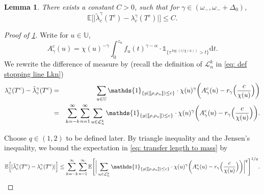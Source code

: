 \documentclass[12pt]{article}
\def\llbracket{[\hspace{-.10em} [ }
\def\rrbracket{ ] \hspace{-.10em}]}
\numberwithin{equation}{section}
\theoremstyle{plain}
\newtheorem{lem}[thm]{Lemma}
\theoremstyle{definition}
\begin{document}
\begin{lem}\label{lem: transfer length to mass}
There exists a constant $C>0$, such that for $\gamma \in (\omega_-, \omega_- + \Delta_0)$,
\begin{equation}\label{eq: transfer length to mass}
\mathbb{E}\Big[\Big|\tilde{\lambda}^{\gamma}_c(T^c)-\lambda^{\gamma}_c(T^c)\Big|\Big]\leq C.
\end{equation}
\end{lem}

\begin{proof}[Proof of \cref{lem: transfer length to mass}]
Write for $u\in\mathbb{U}$,
\[A^{c}_{\gamma}(u) = \chi(u)^{-\gamma}\int^{z_u}_0 f_u(t)^{\gamma-\alpha}\cdot\mathds{1}_{\{\tau^{\log(c/\chi(u))}>t\}}\mathrm{d}t. \]
\noindent We rewrite the difference of measure by (recall the definition of $\mathcal{L}^k_n$ in \eqref{eq: def stopping line Lkn})
\begin{eqnarray*}
\lambda^{\gamma}_c(T^c) - \tilde{\lambda}^{\gamma}_c(T^c) &=& \sum_{u\in\mathbb{U}}\mathds{1}_{\{g(\llbracket \rho, \rho_u \rrbracket)\leq c\}}\cdot \chi(u)^{\gamma}\bigg(A^{c}_{\gamma}(u) - r_{\gamma}\Big(\frac{c}{\chi(u)}\Big)\bigg) \\
&=& \sum_{k=-b}^{\infty}\sum^{\infty}_{n=1} \sum_{u\in\mathcal{L}^k_n} \mathds{1}_{\{g(\llbracket \rho, \rho_u \rrbracket)\leq c\}}\cdot \chi(u)^{\gamma} \bigg(A^{c}_{\gamma}(u) - r_{\gamma}\Big(\frac{c}{\chi(u)}\Big)\bigg).
\end{eqnarray*}

\noindent Choose $q\in (1, 2)$ to be defined later. By triangle inequality and the Jensen's inequality, we bound the expectation in \eqref{eq: transfer length to mass} by
\[ \mathbb{E}\Big[|\tilde\lambda^{\gamma}_c(T^c)-\lambda^{\gamma}_c(T^c)|\Big] \leq \sum^{\infty}_{k=-b}\sum^{\infty}_{n=1}\mathbb{E}\Bigg[\bigg|\sum_{u\in\mathcal{L}^k_n}\mathds{1}_{\{g(\llbracket \rho, \rho_u \rrbracket)\leq c\}}\cdot \chi(u)^{\gamma}\bigg(A^{c}_{\gamma}(u) - r_{\gamma}\Big(\frac{c}{\chi(u)}\Big)\bigg)\bigg|^q\Bigg]^{1/q}. \]


\end{proof}
\end{document}
